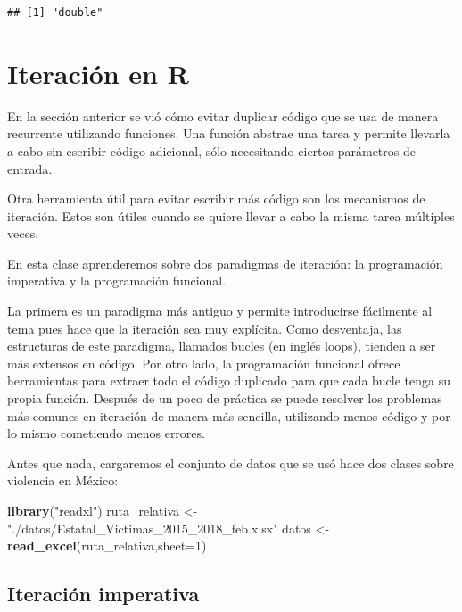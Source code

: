 \documentclass[]{book}
\newenvironment{Shaded}{\begin{snugshade}}{\end{snugshade}}
\newcommand{\KeywordTok}[1]{\textcolor[rgb]{0.13,0.29,0.53}{\textbf{#1}}}
\newcommand{\DataTypeTok}[1]{\textcolor[rgb]{0.13,0.29,0.53}{#1}}
\newcommand{\DecValTok}[1]{\textcolor[rgb]{0.00,0.00,0.81}{#1}}
\newcommand{\StringTok}[1]{\textcolor[rgb]{0.31,0.60,0.02}{#1}}
\newcommand{\NormalTok}[1]{#1}
\theoremstyle{definition}
\theoremstyle{definition}
\theoremstyle{definition}
\theoremstyle{remark}
\begin{document}
\begin{verbatim}
## [1] "double"
\end{verbatim}

\section{Iteración en R}\label{iteracion-en-r}

En la sección anterior se vió cómo evitar duplicar código que se usa de
manera recurrente utilizando funciones. Una función abstrae una tarea y
permite llevarla a cabo sin escribir código adicional, sólo necesitando
ciertos parámetros de entrada.

Otra herramienta útil para evitar escribir más código son los mecanismos
de iteración. Estos son útiles cuando se quiere llevar a cabo la misma
tarea múltiples veces.

En esta clase aprenderemos sobre dos paradigmas de iteración: la
programación imperativa y la programación funcional.

La primera es un paradigma más antiguo y permite introducirse fácilmente
al tema pues hace que la iteración sea muy explícita. Como desventaja,
las estructuras de este paradigma, llamados bucles (en inglés loops),
tienden a ser más extensos en código. Por otro lado, la programación
funcional ofrece herramientas para extraer todo el código duplicado para
que cada bucle tenga su propia función. Después de un poco de práctica
se puede resolver los problemas más comunes en iteración de manera más
sencilla, utilizando menos código y por lo mismo cometiendo menos
errores.

Antes que nada, cargaremos el conjunto de datos que se usó hace dos
clases sobre violencia en México:

\begin{Shaded}
\begin{Highlighting}[]
\KeywordTok{library}\NormalTok{(}\StringTok{"readxl"}\NormalTok{)}
\NormalTok{ruta_relativa <-}\StringTok{ "./datos/Estatal_Victimas_2015_2018_feb.xlsx"}
\NormalTok{datos <-}\StringTok{ }\KeywordTok{read_excel}\NormalTok{(ruta_relativa,}\DataTypeTok{sheet=}\DecValTok{1}\NormalTok{)}
\end{Highlighting}
\end{Shaded}

\subsection{Iteración imperativa}\label{iteracion-imperativa}
\end{document}
